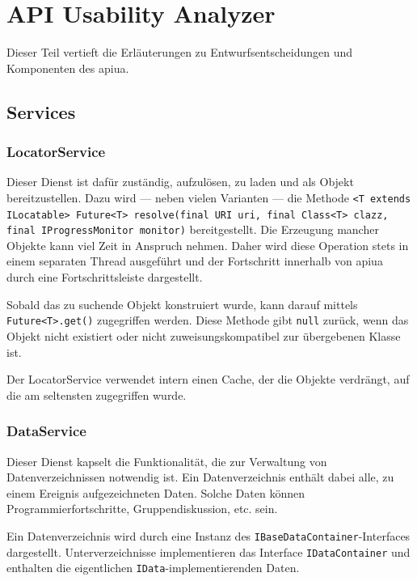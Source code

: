 \glsresetall
\chapter{API Usability Analyzer}
\label{app:apiua}

Dieser Teil vertieft die Erläuterungen zu Entwurfsentscheidungen und Komponenten des \gls{apiua}.

\section{Services}
\label{sec:services}

\subsection*{LocatorService}

Dieser Dienst ist dafür zuständig,  aufzulösen, zu laden und als Objekt bereitzustellen. Dazu wird --- neben vielen Varianten --- die Methode \texttt{<T extends ILocatable> Future<T> resolve(final URI uri, final Class<T> clazz, final IProgressMonitor monitor)} bereitgestellt. Die Erzeugung mancher Objekte kann viel Zeit in Anspruch nehmen. Daher wird diese Operation stets in einem separaten Thread ausgeführt und der Fortschritt innerhalb von \gls{apiua} durch eine Fortschrittsleiste dargestellt.

Sobald das zu suchende Objekt konstruiert wurde, kann darauf mittels \texttt{Future<T>.get()} zugegriffen werden. Diese Methode gibt \texttt{null} zurück, wenn das Objekt nicht existiert oder nicht zuweisungskompatibel zur übergebenen Klasse ist.

Der LocatorService verwendet intern einen Cache, der die Objekte verdrängt, auf die am seltensten zugegriffen wurde.

\subsection*{DataService}

Dieser Dienst kapselt die Funktionalität, die zur Verwaltung von Datenverzeichnissen notwendig ist. Ein Datenverzeichnis enthält dabei alle, zu einem Ereignis aufgezeichneten Daten. Solche Daten können Programmierfortschritte, Gruppendiskussion, etc. sein.

Ein Datenverzeichnis wird durch eine Instanz des \texttt{IBaseDataContainer}-Interfaces dargestellt. Unterverzeichnisse implementieren das Interface \texttt{IDataContainer} und enthalten die eigentlichen \texttt{IData}-implementierenden Daten.

